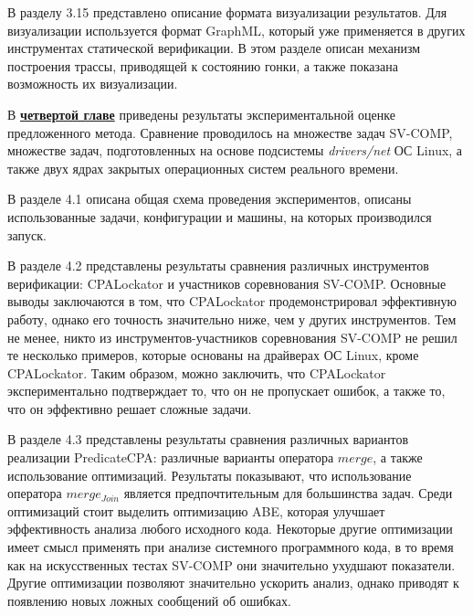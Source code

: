 В разделу 3.15 представлено описание формата визуализации результатов.
Для визуализации используется формат GraphML, который уже применяется в других инструментах статической верификации.
В этом разделе описан механизм построения трассы, приводящей к состоянию гонки, а также показана возможность их визуализации.


В \underline{\textbf{четвертой главе}} приведены результаты экспериментальной оценке предложенного метода.
Сравнение проводилось на множестве задач SV-COMP, множестве задач, подготовленных на основе подсистемы \textit{drivers/net} ОС Linux, а также двух ядрах закрытых операционных систем реального времени.

В разделе 4.1 описана общая схема проведения экспериментов, описаны использованные задачи, конфигурации и машины, на которых производился запуск.

В разделе 4.2 представлены результаты сравнения различных инструментов верификации: CPALockator и участников соревнования SV-COMP.
Основные выводы заключаются в том, что CPALockator продемонстрировал эффективную работу, однако его точность значительно ниже, чем у других инструментов.
Тем не менее, никто из инструментов-участников соревнования SV-COMP не решил те несколько примеров, которые основаны на драйверах ОС Linux, кроме CPALockator.
Таким образом, можно заключить, что CPALockator экспериментально подтверждает то, что он не пропускает ошибок, а также то, что он эффективно решает сложные задачи.

В разделе 4.3 представлены результаты сравнения различных вариантов реализации PredicateCPA: различные варианты оператора $merge$, а также использование оптимизаций.
Результаты показывают, что использование оператора $merge_{Join}$ является предпочтительным для большинства задач.
Среди оптимизаций стоит выделить оптимизацию ABE, которая улучшает эффективность анализа любого исходного кода.
Некоторые другие оптимизации имеет смысл применять при анализе системного программного кода, в то время как на искусственных тестах SV-COMP они значительно ухудшают показатели.
Другие оптимизации позволяют значительно ускорить анализ, однако приводят к появлению новых ложных сообщений об ошибках.


